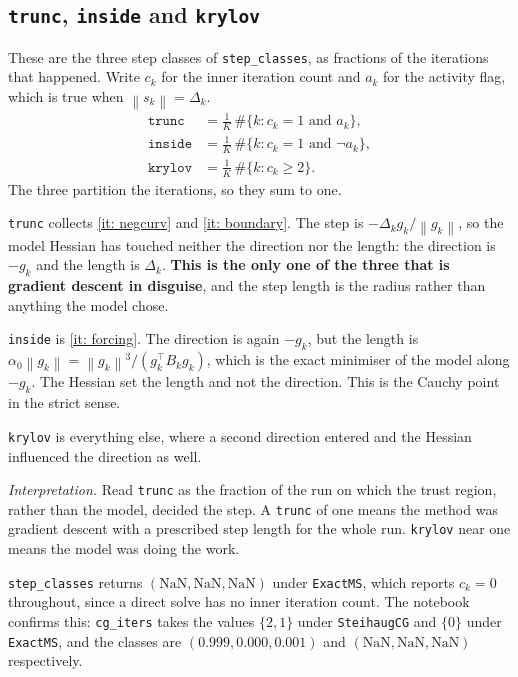 \documentclass[11pt,a4paper]{article}
\providecommand{\norm}[1]{\left \lVert #1 \right \rVert}
\theoremstyle{remark}
\begin{document}
\subsection{\texttt{trunc}, \texttt{inside} and \texttt{krylov}}

These are the three step classes of \texttt{step\_classes}, as fractions of the
iterations that happened. Write $c_k$ for the inner iteration count and $a_k$ for
the activity flag, which is true when $\norm{s_k} = \Delta_k$.
\begin{align}
  \texttt{trunc}  &= \tfrac1K \,\#\{k : c_k = 1 \text{ and } a_k\},
  \label{eqn: trunc} \\
  \texttt{inside} &= \tfrac1K \,\#\{k : c_k = 1 \text{ and } \lnot a_k\},
  \label{eqn: inside} \\
  \texttt{krylov} &= \tfrac1K \,\#\{k : c_k \geq 2\}.
  \label{eqn: krylov}
\end{align}
The three partition the iterations, so they sum to one.

\texttt{trunc} collects \ref{it: negcurv} and \ref{it: boundary}. The step is
$-\Delta_k g_k/\norm{g_k}$, so the model Hessian has touched neither the
direction nor the length: the direction is $-g_k$ and the length is $\Delta_k$.
\textbf{This is the only one of the three that is gradient descent in disguise},
and the step length is the radius rather than anything the model chose.

\texttt{inside} is \ref{it: forcing}. The direction is again $-g_k$, but the
length is $\alpha_0\norm{g_k} = \norm{g_k}^3/(g_k^{\!\top}B_kg_k)$, which is the
exact minimiser of the model along $-g_k$. The Hessian set the length and not the
direction. This is the Cauchy point in the strict sense.

\texttt{krylov} is everything else, where a second direction entered and the
Hessian influenced the direction as well.

\emph{Interpretation.} Read \texttt{trunc} as the fraction of the run on which
the trust region, rather than the model, decided the step. A \texttt{trunc} of
one means the method was gradient descent with a prescribed step length for the
whole run. \texttt{krylov} near one means the model was doing the work.

\texttt{step\_classes} returns $(\mathrm{NaN}, \mathrm{NaN}, \mathrm{NaN})$ under
\texttt{ExactMS}, which reports $c_k = 0$ throughout, since a direct solve has no
inner iteration count. The notebook confirms this: \texttt{cg\_iters} takes the
values $\{2, 1\}$ under \texttt{SteihaugCG} and $\{0\}$ under \texttt{ExactMS},
and the classes are $(0.999, 0.000, 0.001)$ and
$(\mathrm{NaN}, \mathrm{NaN}, \mathrm{NaN})$ respectively.
\end{document}
